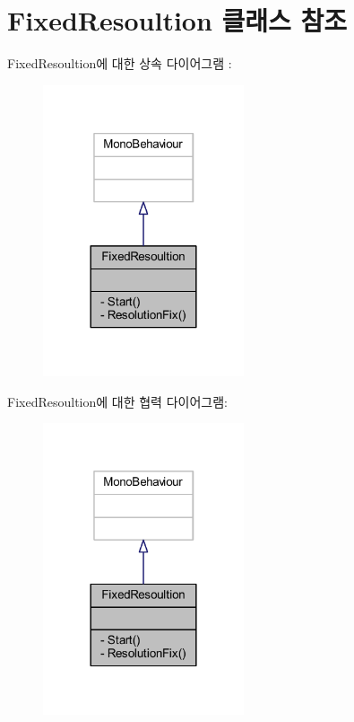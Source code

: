 \hypertarget{class_fixed_resoultion}{}\section{Fixed\+Resoultion 클래스 참조}
\label{class_fixed_resoultion}


Fixed\+Resoultion에 대한 상속 다이어그램 \+: \nopagebreak
\begin{figure}[H]
\begin{center}
\leavevmode
\includegraphics[width=168pt]{d2/d8f/class_fixed_resoultion__inherit__graph}
\end{center}
\end{figure}


Fixed\+Resoultion에 대한 협력 다이어그램\+:\nopagebreak
\begin{figure}[H]
\begin{center}
\leavevmode
\includegraphics[width=168pt]{d1/d0b/class_fixed_resoultion__coll__graph}
\end{center}
\end{figure}
